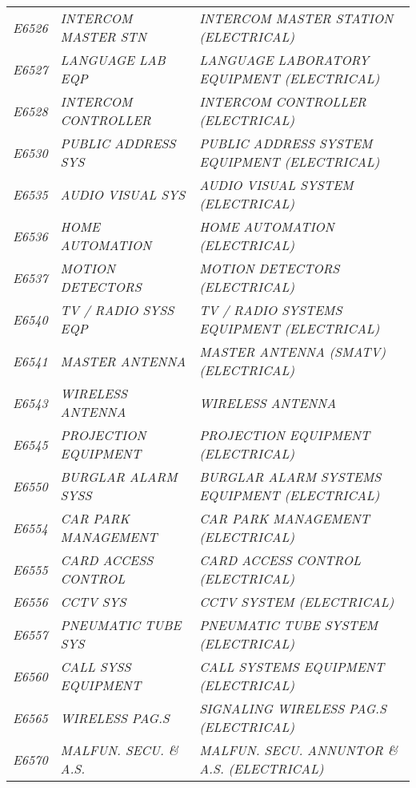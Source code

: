 \begin{landscape}
\begin{longtable}[l]{l%
                  l|%
                  l|}
\itshape E6526       &\itshape INTERCOM MASTER STN   &\itshape INTERCOM MASTER STATION (ELECTRICAL)   \\
\itshape E6527       &\itshape LANGUAGE LAB EQP   &\itshape LANGUAGE LABORATORY EQUIPMENT (ELECTRICAL)   \\
\itshape E6528       &\itshape INTERCOM CONTROLLER   &\itshape INTERCOM CONTROLLER (ELECTRICAL)   \\
\itshape E6530       &\itshape PUBLIC ADDRESS SYS   &\itshape PUBLIC ADDRESS SYSTEM EQUIPMENT (ELECTRICAL)   \\
\itshape E6535       &\itshape AUDIO VISUAL SYS   &\itshape AUDIO VISUAL SYSTEM (ELECTRICAL)   \\
\itshape E6536       &\itshape HOME AUTOMATION   &\itshape HOME AUTOMATION (ELECTRICAL)   \\
\itshape E6537       &\itshape MOTION DETECTORS   &\itshape MOTION DETECTORS (ELECTRICAL)   \\
\itshape E6540       &\itshape TV / RADIO SYSS EQP   &\itshape TV / RADIO SYSTEMS EQUIPMENT (ELECTRICAL)   \\
\itshape E6541       &\itshape MASTER ANTENNA   &\itshape MASTER ANTENNA (SMATV) (ELECTRICAL)   \\
\itshape E6543       &\itshape WIRELESS ANTENNA   &\itshape WIRELESS ANTENNA   \\
\itshape E6545       &\itshape PROJECTION EQUIPMENT   &\itshape PROJECTION EQUIPMENT (ELECTRICAL)   \\
\itshape E6550       &\itshape BURGLAR ALARM SYSS   &\itshape BURGLAR ALARM SYSTEMS EQUIPMENT (ELECTRICAL)   \\
\itshape E6554       &\itshape CAR PARK MANAGEMENT   &\itshape CAR PARK MANAGEMENT  (ELECTRICAL)   \\
\itshape E6555       &\itshape CARD ACCESS CONTROL   &\itshape CARD ACCESS CONTROL (ELECTRICAL)   \\
\itshape E6556       &\itshape CCTV SYS   &\itshape CCTV SYSTEM (ELECTRICAL)   \\
\itshape E6557       &\itshape PNEUMATIC TUBE SYS   &\itshape PNEUMATIC TUBE SYSTEM (ELECTRICAL)   \\
\itshape E6560       &\itshape CALL SYSS EQUIPMENT   &\itshape CALL SYSTEMS EQUIPMENT (ELECTRICAL)   \\
\itshape E6565       &\itshape WIRELESS PAG.S   &\itshape SIGNALING WIRELESS PAG.S (ELECTRICAL)   \\
\itshape E6570       &\itshape MALFUN. SECU. \& A.S.   &\itshape MALFUN. SECU. ANNUNTOR \& A.S. (ELECTRICAL)   \\

\end{longtable}
\end{landscape}
